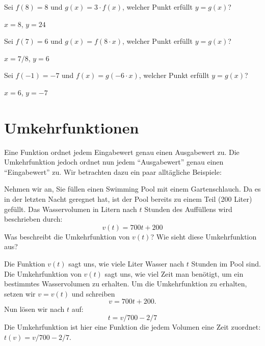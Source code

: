 \begin{exercises}
\begin{exercise}
Sei $f(8) = 8$ und $g(x)=3\cdot f(x)$, welcher Punkt erfüllt $y=g(x)$?
\begin{answer}
$x=8$, $y=24$
\end{answer}
\end{exercise}

\begin{exercise}
Sei $f(7) = 6$ und $g(x)=f(8\cdot x)$, welcher Punkt erfüllt $y=g(x)$?
\begin{answer}
$x=7/8$, $y=6$
\end{answer}
\end{exercise}

\begin{exercise}
Sei $f(-1) = -7$ und $f(x)=g(-6\cdot x)$, welcher Punkt erfüllt
$y=g(x)$?
\begin{answer}
$x=6$, $y=-7$
\end{answer}
\end{exercise}

\end{exercises}

\section{Umkehrfunktionen}
Eine Funktion ordnet jedem Eingabewert genau einen Ausgabewert zu. Die Umkehrfunktion jedoch ordnet nun jedem ``Ausgabewert'' genau einen ``Eingabewert'' zu. Wir betrachten dazu ein paar alltägliche Beispiele:

\begin{example}
Nehmen wir an, Sie füllen einen Swimming Pool mit einem Gartenschlauch. Da es in der letzten Nacht geregnet hat, ist der Pool bereits zu einem Teil (200 Liter) gefüllt. Das Wasservolumen in Litern nach $t$ Stunden des Auffüllens wird beschrieben durch:
\[
v(t) = 700t + 200
\]
Was beschreibt die Umkehrfunktion von $v(t)$? Wie sieht diese Umkehrfunktion aus?
\end{example}


\begin{solution}
Die Funktion $v(t)$ sagt uns, wie viele Liter Wasser nach $t$ Stunden im Pool sind. Die Umkehrfunktion von $v(t)$ sagt uns, wie viel Zeit man benötigt, um ein bestimmtes Wasservolumen zu erhalten.
Um die Umkehrfunktion zu erhalten, setzen wir $v=v(t)$ und schreiben
\[
v = 700t + 200.
\]
Nun lösen wir nach $t$ auf:
\[
t = v/700 - 2/7
\]
Die Umkehrfunktion ist hier eine Funktion die jedem Volumen eine Zeit zuordnet:
$t(v) = v/700-2/7$.
\end{solution}


